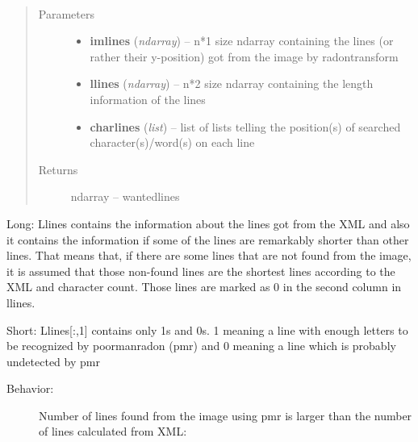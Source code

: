 \documentclass[letterpaper,10pt,english]{sphinxmanual}
\begin{document}
\begin{fulllineitems}
\begin{fulllineitems}
\end{fulllineitems}


\begin{fulllineitems}
\label{code:OratUtils.OratUtils.padlines}~\begin{quote}\begin{description}
\item[{Parameters}] \leavevmode\begin{itemize}
\item {} 
\textbf{imlines} (\emph{ndarray}) -- n*1 size ndarray containing the lines (or rather their y-position) got from the image by radontransform

\item {} 
\textbf{llines} (\emph{ndarray}) -- n*2 size ndarray containing the length information of the lines

\item {} 
\textbf{charlines} (\emph{list}) -- list of lists telling the position(s) of searched character(s)/word(s) on each line

\end{itemize}

\item[{Returns}] \leavevmode
ndarray -- wantedlines

\end{description}\end{quote}

Long:
Llines contains the information about the lines got from the XML and also it contains the 
information if some of the lines are remarkably shorter than other lines. That means that, if there are some lines that 
are not found from the image, it is assumed that those non-found lines are the shortest lines according to the XML and 
character count. Those lines are marked as 0 in the second column in llines.

Short:
Llines{[}:,1{]} contains only 1s and 0s. 1 meaning a line with enough letters to be recognized by poormanradon (pmr) 
and 0 meaning a line which is probably undetected by pmr
\begin{description}
\item[{Behavior:}] \leavevmode
Number of lines found from the image using pmr is larger than 
the number of lines calculated from XML:
\begin{quote}


\end{quote}
\end{description}
\end{fulllineitems}
\end{fulllineitems}
\end{document}
